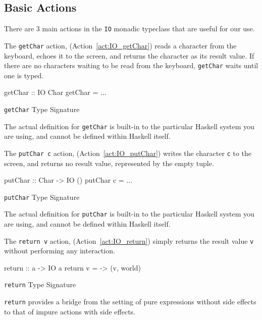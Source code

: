 \subsection{Basic \texorpdfstring{}{\texttt{IO}} Actions}\label{subsec:Basic_IO_Actions}
There are 3 main actions in the \texttt{IO} monadic typeclass that are useful for our use.
\begin{nocrefenumerate}
\item {}\label{act:IO_getChar}
\item {}\label{act:IO_putChar}
\item {}\label{act:IO_return}
\end{nocrefenumerate}

The \texttt{getChar} action, (Action~\ref{act:IO_getChar}) reads a character from the keyboard, echoes it to the screen, and returns the character as its result value.
If there are no characters waiting to be read from the keyboard, \texttt{getChar} waits until one is typed.
\begin{listing}[h!tbp]
\begin{haskellsource}
getChar :: IO Char
getChar = ...
\end{haskellsource}
\caption{\texttt{getChar} Type Signature}
\label{lst:IO_getChar_Type}
\end{listing}
The actual definition for \texttt{getChar} is built-in to the particular Haskell system you are using, and cannot be defined within Haskell itself.

The \texttt{putChar c} action, (Action~\ref{act:IO_putChar}) writes the character \texttt{c} to the screen, and returns no result value, represented by the empty tuple.
\begin{listing}[h!tbp]
\begin{haskellsource}
putChar :: Char -> IO ()
putChar c = ...
\end{haskellsource}
\caption{\texttt{putChar} Type Signature}
\label{lst:IO_putChar_Type}
\end{listing}
The actual definition for \texttt{putChar} is built-in to the particular Haskell system you are using, and cannot be defined within Haskell itself.

The \texttt{return v} action, (Action~\ref{act:IO_return}) simply returns the result value \texttt{v} without performing any interaction.
\begin{listing}[h!tbp]
\begin{haskellsource}
return :: a -> IO a
return v = \world -> (v, world)
\end{haskellsource}
\caption{\texttt{return} Type Signature}
\label{lst:IO_return_Type}
\end{listing}
\texttt{return} provides a bridge from the setting of pure expressions without side effects to that of impure actions with side effects.


